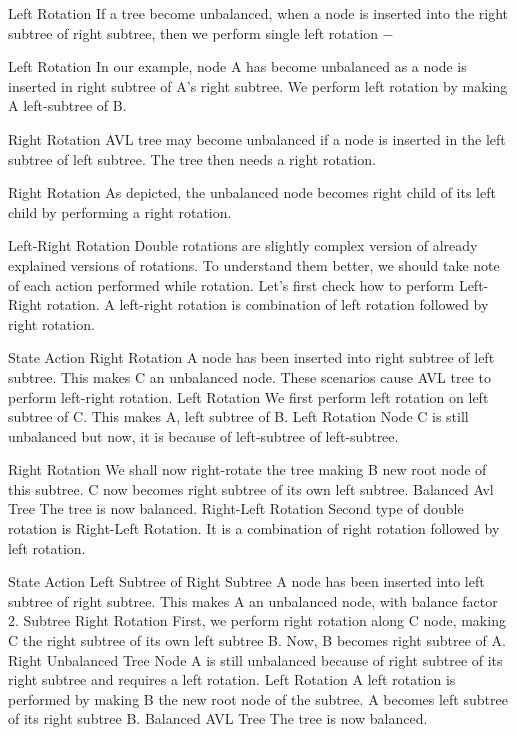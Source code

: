 \documentclass{beamer}
\begin{document}
\begin{frame}
Left Rotation
If a tree become unbalanced, when a node is inserted into the right subtree of right subtree, then we perform single left rotation −

Left Rotation
In our example, node A has become unbalanced as a node is inserted in right subtree of A's right subtree. We perform left rotation by making A left-subtree of B.
\end{frame}
\begin{frame}
Right Rotation
AVL tree may become unbalanced if a node is inserted in the left subtree of left subtree. The tree then needs a right rotation.

Right Rotation
As depicted, the unbalanced node becomes right child of its left child by performing a right rotation.

Left-Right Rotation
Double rotations are slightly complex version of already explained versions of rotations. To understand them better, we should take note of each action performed while rotation. Let's first check how to perform Left-Right rotation. A left-right rotation is combination of left rotation followed by right rotation.
\end{frame}
\begin{frame}
State	Action
Right Rotation	A node has been inserted into right subtree of left subtree. This makes C an unbalanced node. These scenarios cause AVL tree to perform left-right rotation.
Left Rotation	We first perform left rotation on left subtree of C. This makes A, left subtree of B.
Left Rotation	Node C is still unbalanced but now, it is because of left-subtree of left-subtree.
\end{frame}
\begin{frame}
Right Rotation	We shall now right-rotate the tree making B new root node of this subtree. C now becomes right subtree of its own left subtree.
Balanced Avl Tree	The tree is now balanced.
Right-Left Rotation
Second type of double rotation is Right-Left Rotation. It is a combination of right rotation followed by left rotation.
\end{frame}
\begin{frame}
State	Action
Left Subtree of Right Subtree	A node has been inserted into left subtree of right subtree. This makes A an unbalanced node, with balance factor 2.
Subtree Right Rotation	First, we perform right rotation along C node, making C the right subtree of its own left subtree B. Now, B becomes right subtree of A.
Right Unbalanced Tree	Node A is still unbalanced because of right subtree of its right subtree and requires a left rotation.
Left Rotation	A left rotation is performed by making B the new root node of the subtree. A becomes left subtree of its right subtree B.
Balanced AVL Tree	The tree is now balanced.
\end{frame}
\end{document}

